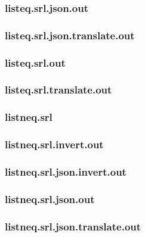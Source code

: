 \subsubsection{listeq.srl.json.out}
\label{app:listeq_srl.json.out}

\subsubsection{listeq.srl.json.translate.out}
\label{app:listeq_srl.json.translate.out}

\subsubsection{listeq.srl.out}
\label{app:listeq_srl.out}

\subsubsection{listeq.srl.translate.out}
\label{app:listeq_srl.translate.out}

\subsubsection{listneq.srl}
\label{app:listneq_srl}

\subsubsection{listneq.srl.invert.out}
\label{app:listneq_srl.invert.out}

\subsubsection{listneq.srl.json.invert.out}
\label{app:listneq_srl.json.invert.out}

\subsubsection{listneq.srl.json.out}
\label{app:listneq_srl.json.out}

\subsubsection{listneq.srl.json.translate.out}
\label{app:listneq_srl.json.translate.out}

